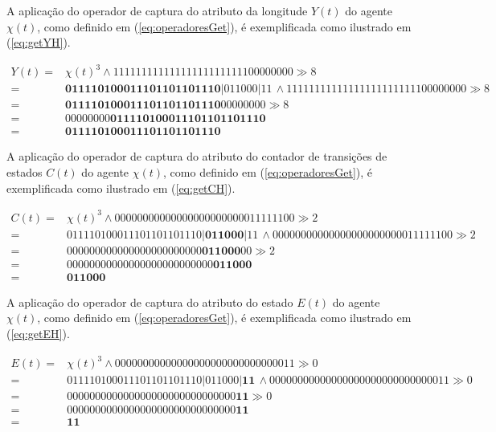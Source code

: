 A aplicação do operador de captura do atributo da longitude $Y(t)$ do agente $\chi(t)$, como definido em (\ref{eq:operadoresGet}), é exemplificada como ilustrado em (\ref{eq:getYH}).

\begin{equation}
 \begin{split}
 Y(t) = & \chi(t)^3 \wedge 11111111111111111111111100000000 \gg 8 \\
      = & \boldsymbol{0 1 1 1 1 0 1 0 0 0 1 1 1 0 1 1 0 1 1 0 1 1 1 0} | 0 1 1 0 0 0 | 1 1 \, \wedge 11111111111111111111111100000000 \gg 8 \\
      = & \boldsymbol{0 1 1 1 1 0 1 0 0 0 1 1 1 0 1 1 0 1 1 0 1 1 1 0} 0 0 0 0 0 0 0 0 \gg 8 \\
      = & 0 0 0 0 0 0 0 0 \boldsymbol{0 1 1 1 1 0 1 0 0 0 1 1 1 0 1 1 0 1 1 0 1 1 1 0} \\
      = & \boldsymbol{0 1 1 1 1 0 1 0 0 0 1 1 1 0 1 1 0 1 1 0 1 1 1 0}
 \label{eq:getYH}
 \end{split}
\end{equation}

A aplicação do operador de captura do atributo do contador de transições de estados $C(t)$ do agente $\chi(t)$, como definido em (\ref{eq:operadoresGet}), é exemplificada como ilustrado em (\ref{eq:getCH}).

\begin{equation}
 \begin{split}
 C(t) = & \chi(t)^3 \wedge 00000000000000000000000011111100 \gg 2 \\
      = & 0 1 1 1 1 0 1 0 0 0 1 1 1 0 1 1 0 1 1 0 1 1 1 0 | \boldsymbol{0 1 1 0 0 0} | 1 1 \, \wedge 00000000000000000000000011111100 \gg 2 \\
      = & 0 0 0 0 0 0 0 0 0 0 0 0 0 0 0 0 0 0 0 0 0 0 0 0 \boldsymbol{0 1 1 0 0 0} 0 0 \gg 2 \\
      = & 0 0 0 0 0 0 0 0 0 0 0 0 0 0 0 0 0 0 0 0 0 0 0 0 0 0 \boldsymbol{0 1 1 0 0 0} \\
      = & \boldsymbol{0 1 1 0 0 0}
 \label{eq:getCH}
 \end{split}
\end{equation}

A aplicação do operador de captura do atributo do estado $E(t)$ do agente $\chi(t)$, como definido em (\ref{eq:operadoresGet}), é exemplificada como ilustrado em (\ref{eq:getEH}).

\begin{equation}
 \begin{split}
 E(t) = & \chi(t)^3 \wedge 00000000000000000000000000000011 \gg 0 \\
      = & 0 1 1 1 1 0 1 0 0 0 1 1 1 0 1 1 0 1 1 0 1 1 1 0 | 0 1 1 0 0 0 | \boldsymbol{1 1} \, \wedge 00000000000000000000000000000011 \gg 0 \\
      = & 0 0 0 0 0 0 0 0 0 0 0 0 0 0 0 0 0 0 0 0 0 0 0 0 0 0 0 0 0 0 \boldsymbol{1 1} \gg 0 \\
      = & 0 0 0 0 0 0 0 0 0 0 0 0 0 0 0 0 0 0 0 0 0 0 0 0 0 0 0 0 0 0 \boldsymbol{1 1} \\
      = & \boldsymbol{1 1}
 \label{eq:getEH}
 \end{split}
\end{equation}

